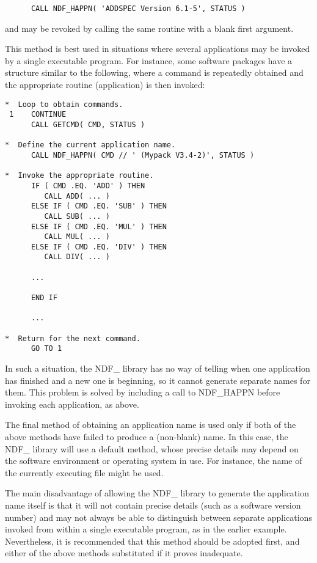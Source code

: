\small
\begin{verbatim}
      CALL NDF_HAPPN( 'ADDSPEC Version 6.1-5', STATUS )
\end{verbatim}
\normalsize

and may be revoked by calling the same routine with a blank first
argument.

This method is best used in situations where several applications may
be invoked by a single executable program. For instance, some software
packages have a structure similar to the following, where a command is
repeatedly obtained and the appropriate routine (application) is then
invoked:

\small
\begin{verbatim}
*  Loop to obtain commands.
 1    CONTINUE
      CALL GETCMD( CMD, STATUS )

*  Define the current application name.
      CALL NDF_HAPPN( CMD // ' (Mypack V3.4-2)', STATUS )

*  Invoke the appropriate routine.
      IF ( CMD .EQ. 'ADD' ) THEN
         CALL ADD( ... )
      ELSE IF ( CMD .EQ. 'SUB' ) THEN
         CALL SUB( ... )
      ELSE IF ( CMD .EQ. 'MUL' ) THEN
         CALL MUL( ... )
      ELSE IF ( CMD .EQ. 'DIV' ) THEN
         CALL DIV( ... )
      
      ...

      END IF

      ...

*  Return for the next command.
      GO TO 1
\end{verbatim}
\normalsize

In such a situation, the NDF\_ library has no way of telling when one
application has finished and a new one is beginning, so it cannot
generate separate names for them. This problem is solved by including
a call to NDF\_HAPPN before invoking each application, as above.

The final method of obtaining an application name is used only if both
of the above methods have failed to produce a (non-blank) name. In
this case, the NDF\_ library will use a default method, whose precise
details may depend on the software environment or operating system in
use. For instance, the name of the currently executing file might be
used.

The main disadvantage of allowing the NDF\_ library to generate the
application name itself is that it will not contain precise details
(such as a software version number) and may not always be able to
distinguish between separate applications invoked from within a single
executable program, as in the earlier example. Nevertheless, it is
recommended that this method should be adopted first, and either of
the above methods substituted if it proves inadequate.

